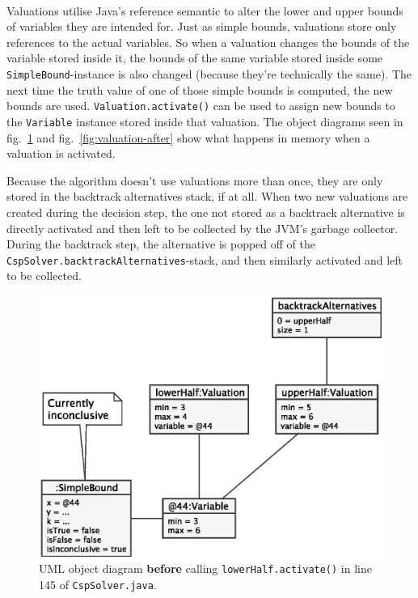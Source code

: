 \paragraph{}
Valuations utilise Java's reference semantic to alter the lower and upper bounds of variables they are intended for.
Just as simple bounds, valuations store only references to the actual variables.
So when a valuation changes the bounds of the variable stored inside it, the bounds of the same variable stored inside some \texttt{SimpleBound}-instance is also changed (because they're technically the same).
The next time the truth value of one of those simple bounds is computed, the new bounds are used.
\texttt{Valuation.activate()} can be used to assign new bounds to the \texttt{Variable} instance stored inside that valuation.
The object diagrams seen in fig.~\ref{fig:valuation-before} and fig.~\ref{fig:valuation-after} show what happens in memory when a valuation is activated.

Because the algorithm doesn't use valuations more than once, they are only stored in the backtrack alternatives stack, if at all.
When two new valuations are created during the decision step, the one not stored as a backtrack alternative is directly activated and then left to be collected by the JVM's garbage collector.
During the backtrack step, the alternative is popped off of the \texttt{CspSolver.backtrackAlternatives}-stack, and then similarly activated and left to be collected.


\begin{figure}[H]
    \centering
    \includegraphics[width=.7\textwidth]{images/valuation-before}
    \caption{UML object diagram \textbf{before} calling \texttt{lowerHalf.activate()} in line 145 of \texttt{CspSolver.java}.}
    \label{fig:valuation-before}
\end{figure}


